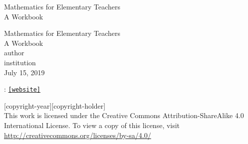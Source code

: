 \documentclass[twoside,11pt,]{book}
\newcommand{\mono}[1]{\texttt{#1}}
\begin{document}
\frontmatter
\thispagestyle{empty}
{\centering
\vspace*{0.28\textheight}
{\Huge Mathematics for Elementary Teachers}\\[2\baselineskip]
{\LARGE A Workbook}\\
}
\clearpage
\thispagestyle{empty}
\null%
\clearpage
\thispagestyle{empty}
{\centering
\vspace*{0.14\textheight}
{\Huge Mathematics for Elementary Teachers}\\[\baselineskip]
{\LARGE A Workbook}\\[3\baselineskip]
{\Large \textbraceleft{}author\textbraceright{}}\\[0.5\baselineskip]
{\Large \textbraceleft{}institution\textbraceright{}}\\[3\baselineskip]
{\Large July 15, 2019}\\}
\clearpage
\thispagestyle{empty}
\hypertarget{g:colophon:idm12974333872}{}
: \href{[website]}{\mono{[website]}}\par\medskip
\noindent\textcopyright{}[copyright-year]\quad{}[copyright-holder]\\[0.5\baselineskip]
 This work is licensed under the Creative Commons Attribution-ShareAlike 4.0 International License. To view a copy of this license, visit \href{http://creativecommons.org/licenses/by-sa/4.0/}{http:\slash{}\slash{}creativecommons.org\slash{}licenses\slash{}by-sa\slash{}4.0\slash{}}\par\medskip
{}
\null\clearpage
\setcounter{tocdepth}{2}
\renewcommand*\contentsname{Contents}
\tableofcontents
\mainmatter
%
%
\typeout{************************************************}
\typeout{************************************************}
%
\end{document}
